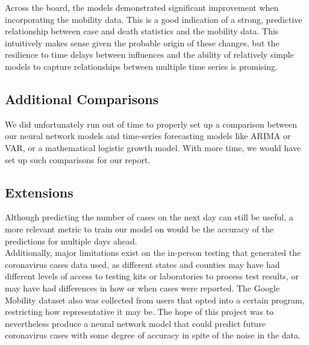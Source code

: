 ﻿\documentclass{article}
\begin{document}
\begin{multicols}{2}
Across the board, the models demonstrated significant improvement when
incorporating the mobility data.
This is a good indication of a strong, predictive relationship between case and
death statistics and the mobility data.
This intuitively makes sense given the probable origin of these changes,
but the resilience to time delays between influences and the ability of
relatively simple models to capture relationships between multiple time series
is promising. 

\subsection*{Additional Comparisons}

We did unfortunately run out of time to properly set up a comparison between our
neural network models and time-series forecasting models like ARIMA or VAR, or a
mathematical logistic growth model. With more time, we would have set up such
comparisons for our report.

\subsection*{Extensions}

Although predicting the number of cases on the next day can still be useful, a
more relevant metric to train our model on would be the accuracy of the
predictions for multiple days ahead.\\
Additionally, major limitations exist on the in-person testing that generated
the coronavirus cases data used, as different states and counties may have had
different levels of access to testing kits or laboratories to process test
results, or may have had differences in how or when cases were reported. The
Google Mobility dataset also was collected from users that opted into a certain
program, restricting how representative it may be. The hope of this project was
to nevertheless produce a neural network model that could predict future
coronavirus cases with some degree of accuracy in spite of the noise in the
data.

\end{multicols}
\end{document}
